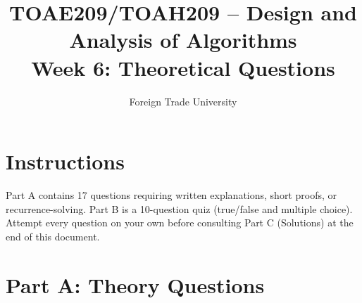 \documentclass[11pt]{article}
\title{TOAE209/TOAH209 -- Design and Analysis of Algorithms\\[4pt]
\large Week 6: Theoretical Questions}
\author{Foreign Trade University}
\date{}
\begin{document}
\maketitle

\section*{Instructions}

Part A contains 17 questions requiring written explanations, short proofs, or
recurrence-solving. Part B is a 10-question quiz (true/false and multiple choice). Attempt
every question on your own before consulting Part C (Solutions) at the end of this document.

\section*{Part A: Theory Questions}
\end{document}
